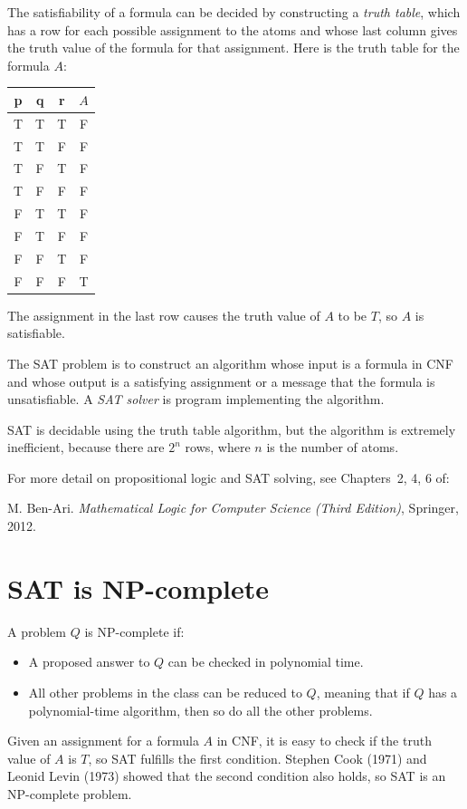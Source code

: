 \documentclass[11pt,a4paper]{article}
\begin{document}
The satisfiability of a formula can be decided by constructing a \emph{truth table}, which has a row for each possible assignment to the atoms and whose last column gives the truth value of the formula for that assignment. Here is the truth table for the formula $A$:
\begin{center}
\begin{tabular}{|c|c|c||c|}
\hline
p & q & r & $A$\\\hline
T & T & T & F\\\hline
T & T & F & F\\\hline
T & F & T & F\\\hline
T & F & F & F\\\hline
F & T & T & F\\\hline
F & T & F & F\\\hline
F & F & T & F\\\hline
F & F & F & T\\\hline
\end{tabular}
\end{center}
The assignment in the last row causes the truth value of $A$ to be $T$, so $A$ is satisfiable.

The SAT problem is to construct an algorithm whose input is a formula in CNF and whose output is a satisfying assignment or a message that the formula is unsatisfiable. A \emph{SAT solver} is program implementing the algorithm.

SAT is decidable using the truth table algorithm, but the algorithm is extremely inefficient, because there are $2^n$ rows, where $n$ is the number of atoms.

For more detail on propositional logic and SAT solving, see Chapters~2, 4, 6 of:

M. Ben-Ari. \textit{Mathematical Logic for Computer Science (Third Edition)}, Springer, 2012.

\section{SAT is NP-complete}

A problem $Q$ is NP-complete if:
\begin{itemize}
\item A proposed answer to $Q$ can be checked in polynomial time.
\item All other problems in the class can be reduced to $Q$, meaning that if $Q$ has a polynomial-time algorithm, then so do all the other problems.
\end{itemize}
Given an assignment for a formula $A$ in CNF, it is easy to check if the truth value of $A$ is $T$, so SAT fulfills the first condition. Stephen Cook (1971) and Leonid Levin (1973) showed that the second condition also holds, so SAT is an NP-complete problem.
\end{document}
